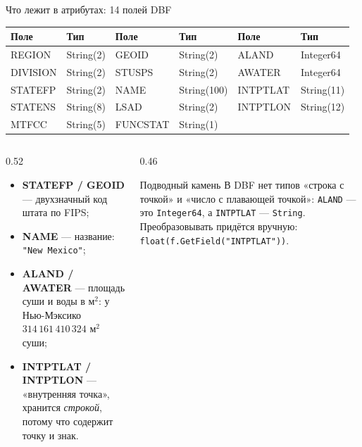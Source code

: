 \documentclass[aspectratio=169,10pt]{beamer}
\begin{document}
\begin{frame}{Что лежит в атрибутах: 14 полей DBF}
\footnotesize
{}
\begin{tabular}{@{}llllll@{}}
  \toprule
  Поле & Тип & Поле & Тип & Поле & Тип \\
  \midrule
  REGION   & String(2)    & GEOID    & String(2)    & ALAND    & Integer64 \\
  DIVISION & String(2)    & STUSPS   & String(2)    & AWATER   & Integer64 \\
  STATEFP  & String(2)    & NAME     & String(100)  & INTPTLAT & String(11) \\
  STATENS  & String(8)    & LSAD     & String(2)    & INTPTLON & String(12) \\
  MTFCC    & String(5)    & FUNCSTAT & String(1)    &          & \\
  \bottomrule
\end{tabular}

\vspace{0.6em}
\begin{columns}[T,onlytextwidth]
  \begin{column}{0.52\textwidth}
    \begin{itemize}\itemsep1pt
      \item \textbf{STATEFP / GEOID} --- двухзначный код штата по FIPS;
      \item \textbf{NAME} --- название: \texttt{"New Mexico"};
      \item \textbf{ALAND / AWATER} --- площадь суши и воды в м$^2$:
            у Нью-Мэксико $314\,161\,410\,324$ м$^2$ суши;
      \item \textbf{INTPTLAT / INTPTLON} --- «внутренняя точка»,
            хранится \emph{строкой}, потому что содержит точку и знак.
    \end{itemize}
  \end{column}
  \begin{column}{0.46\textwidth}
    \begin{alertblock}{Подводный камень}\small
      В DBF нет типов «строка с точкой» и «число с плавающей точкой»:
      \texttt{ALAND} --- это \texttt{Integer64}, а \texttt{INTPTLAT} ---
      \texttt{String}. Преобразовывать придётся вручную:
      \texttt{float(f.GetField("INTPTLAT"))}.
    \end{alertblock}
  \end{column}
\end{columns}
\end{frame}
\end{document}
